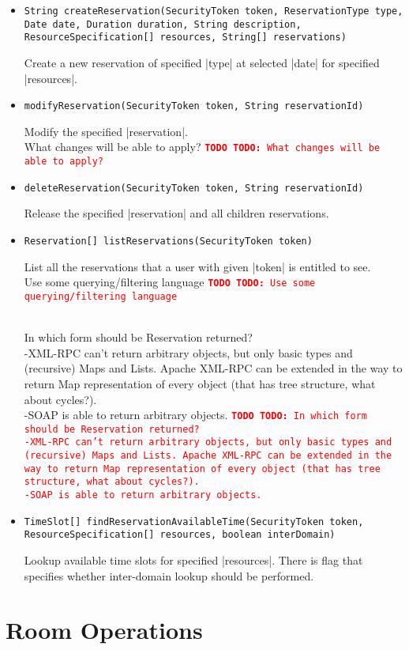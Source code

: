 \documentclass[a4paper]{report}
\newcommand{\APIcmd}[1]{%
\item \lstinline[style=myinline]!#1!%

}
\newenvironment{APIdef}{\begin{itemize}}{\end{itemize}}
\newcommand{\TODO}[1]{%
\def\empty{}%
\def\prvniparametr{#1}%
\ifx\prvniparametr\empty%
\begingroup\tt\textcolor{red}{\noindent\textbf{TODO}}\endgroup
\else%
\begingroup\tt\textcolor{red}{\noindent\textbf{TODO:}\ #1}\endgroup
\fi%
}
\begin{document}
\begin{APIdef}

\APIcmd{String createReservation(SecurityToken token, ReservationType type, Date date, Duration duration, String description, ResourceSpecification[] resources, String[] reservations)}
Create a new reservation of specified |type| at selected |date| for specified |resources|.

\APIcmd{modifyReservation(SecurityToken token, String reservationId)}
Modify the specified |reservation|.
\\ \TODO{What changes will be able to apply?}

\APIcmd{deleteReservation(SecurityToken token, String reservationId)}
Release the specified |reservation| and all children reservations.

\APIcmd{Reservation[] listReservations(SecurityToken token)}
List all the reservations that a user with given |token| is entitled to see.
\\ \TODO{Use some querying/filtering language}
\\ \TODO{In which form should be Reservation returned? 
   \\ -XML-RPC can't return arbitrary objects, but only basic types and (recursive) Maps and Lists. Apache XML-RPC can be extended in the way to return Map representation of every object (that has tree structure, what about cycles?).
   \\ -SOAP is able to return arbitrary objects.}

\APIcmd{TimeSlot[] findReservationAvailableTime(SecurityToken token, ResourceSpecification[] resources, boolean interDomain)}
Lookup available time slots for specified |resources|. There is flag that specifies whether inter-domain lookup should be performed.


\end{APIdef}


\section{Room Operations}
\end{document}
